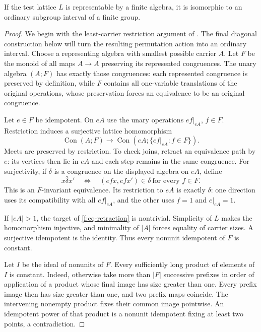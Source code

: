 \begin{proposition}\label{f:prop-ordinary-interval}
If the test lattice $L$ is representable by a finite algebra, it is
isomorphic to an ordinary subgroup interval of a finite group.
\end{proposition}
\begin{proof}
We begin with the least-carrier restriction argument of
\citet[Lemma~1]{PalfyPudlak1980}. The final diagonal construction below
will turn the resulting permutation action into an ordinary interval.
Choose a representing algebra with smallest possible carrier $A$. Let $F$
be the monoid of all maps $A\to A$ preserving its represented congruences.
The unary algebra $(A;F)$ has exactly those congruences: each represented
congruence is preserved by definition, while $F$ contains all one-variable
translations of the original operations, whose preservation forces an
equivalence to be an original congruence.

Let $e\in F$ be idempotent. On $eA$ use the unary operations
$ef|_{eA}$, $f\in F$. Restriction induces a surjective lattice homomorphism
\begin{equation}\label{f:eq-retraction}
 \operatorname{Con}(A;F)\longrightarrow
 \operatorname{Con}(eA;\{ef|_{eA}:f\in F\}).
\end{equation}
Meets are preserved by restriction. To check joins, retract an equivalence
path by $e$: its vertices then lie in $eA$ and each step remains in the
same congruence. For surjectivity, if $\delta$ is a congruence on the displayed
algebra on $eA$, define
\[
 x\mathrel{\widehat\delta}x'
 \quad\Longleftrightarrow\quad
 (efx,efx')\in\delta\ \text{for every }f\in F.
\]
This is an $F$-invariant equivalence. Its restriction to $eA$ is exactly
$\delta$: one direction uses its compatibility with all $ef|_{eA}$, and
the other uses $f=1$ and $e|_{eA}=1$.

If $|eA|>1$, the target of \eqref{f:eq-retraction} is nontrivial. Simplicity
of $L$ makes the homomorphism injective, and minimality of $|A|$ forces
equality of carrier sizes. A surjective idempotent is the identity.
Thus every nonunit idempotent of $F$ is constant.

Let $I$ be the ideal of nonunits of $F$. Every sufficiently long product
of elements of $I$ is constant. Indeed, otherwise take more than $|F|$
successive prefixes in order of application of a product whose final
image has size greater than one. Every prefix image then has size greater
than one, and two prefix maps coincide. The intervening nonempty product
fixes their common image pointwise. An idempotent power of that product
is a nonunit idempotent fixing at least two points, a contradiction.


\end{proof}
